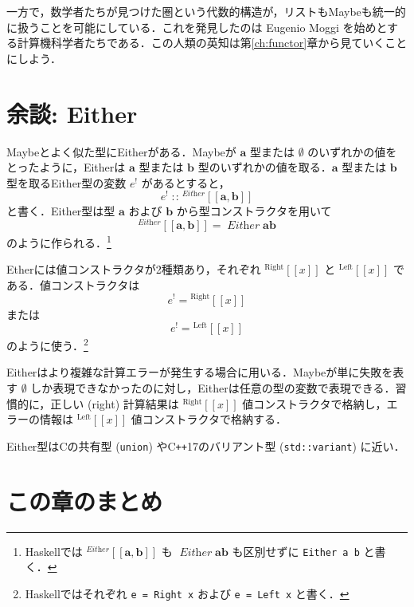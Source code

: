 \documentclass[a4paper,twocolumn]{jsbook}
\def\[{\left[\!\left[}
\def\]{\right]\!\right]}
\newcommand{\programminglanguage}[1]{\textsf{#1}}
\newcommand{\clang}{\programminglanguage{C}}
\newcommand{\cxx}{\programminglanguage{C}\texttt{++}}
\newcommand{\cxxseventeen}{\cxx\programminglanguage{17}}
\newcommand{\haskell}{\programminglanguage{Haskell}}
\newcommand{\code}[1]{\texttt{#1}}
\newcommand{\mNothing}{\emptyset}
\DeclareMathOperator{\mIn}{{:\!:}}
\newcommand{\mSpecialSub}[1]{\text{#1}}
\newcommand{\mLeft}{\mSpecialSub{Left}}
\newcommand{\mRight}{\mSpecialSub{Right}}
\newcommand{\mType}[1]{\mathbf{#1}}
\newcommand{\mTypeConstructor}[1]{\textit{#1}}
\DeclareMathOperator{\mEitherTypeConstructor}{\mTypeConstructor{Either}}
\newcommand{\mGenericTypeAssembleII}[3]{{}^{\mTypeConstructor{#1}}\[\mType{#2},\mType{#3}\]}
\newcommand{\mEitherType}[2]{\mGenericTypeAssembleII{Either}{#1}{#2}}
\newcommand{\mGenericValueConstructor}[1]{\mathrm{#1}}
\newcommand{\mGenericWith}[2]{{}^\mGenericValueConstructor{#1}\[#2\]}
\newcommand{\mLeftWith}[1]{\mGenericWith{\mLeft}{#1}}
\newcommand{\mRightWith}[1]{\mGenericWith{\mRight}{#1}}
\newcommand{\mEither}[1]{{#1}^!}
\begin{document}

一方で，数学者たちが見つけた圏という代数的構造が，リストもMaybeも統一的に扱うことを可能にしている．これを発見したのは Eugenio Moggi を始めとする計算機科学者たちである．この人類の英知は第\ref{ch:functor}章から見ていくことにしよう．


\section{余談: Either}

Maybeとよく似た型にEitherがある．Maybeが $\mType{a}$ 型または $\mNothing$ のいずれかの値をとったように，Eitherは $\mType{a}$ 型または $\mType{b}$ 型のいずれかの値を取る．$\mType{a}$ 型または $\mType{b}$ 型を取るEither型の変数 $\mEither{e}$ があるとすると，
\begin{equation}
\mEither{e}\mIn{}\mEitherType{a}{b}
\end{equation}
と書く．Either型は型 $\mType{a}$ および $\mType{b}$ から型コンストラクタを用いて
\begin{equation}
\mEitherType{a}{b}=\mEitherTypeConstructor\mType{a}\mType{b}
\end{equation}
のように作られる．\footnote{\haskell では $\mEitherType{a}{b}$ も $\mEitherTypeConstructor\mType{a}\mType{b}$ も区別せずに \code{Either a b} と書く．}

Etherには値コンストラクタが2種類あり，それぞれ $\mRightWith{x}$ と $\mLeftWith{x}$ である．値コンストラクタは
\begin{equation}
\mEither{e}=\mRightWith{x}
\end{equation}
または
\begin{equation}
\mEither{e}=\mLeftWith{x}
\end{equation}
のように使う．\footnote{\haskell ではそれぞれ \code{e = Right x} および \code{e = Left x} と書く．}

Eitherはより複雑な計算エラーが発生する場合に用いる．Maybeが単に失敗を表す $\mNothing$ しか表現できなかったのに対し，Eitherは任意の型の変数で表現できる．習慣的に，正しい (right) 計算結果は $\mRightWith{x}$ 値コンストラクタで格納し，エラーの情報は $\mLeftWith{x}$ 値コンストラクタで格納する．

Either型は\clang の共有型 (\code{union}) や\cxxseventeen のバリアント型 (\code{std::variant}) に近い．

\section{この章のまとめ}
\end{document}
